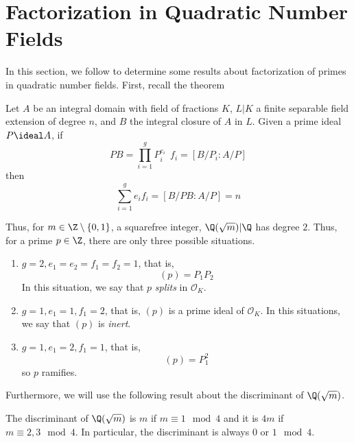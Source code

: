 \documentclass[11pt,leqno,oneside]{amsart}
\numberwithin{thm}{section}
\renewcommand{\O}{\mathcal{O}}
\begin{document}
\section{Factorization in Quadratic Number Fields}
In this section, we follow \cite{ash} to determine some results about
factorization of primes in quadratic number fields. First, recall the theorem
\begin{thm}
  Let \(A\) be an integral domain with field of fractions \(K\),
  \(L|K\) a finite
  separable field extension of degree \(n\), and \(B\) the
  integral closure of \(A\) in 
  \(L\). Given a prime ideal \(P \ideal A\), if \[
    PB = \prod_{i=1}^g P_i^{e_i} \ \ f_i = [B/P_i:A/P]
  \]
  then \[
    \sum_{i=1}^g e_i f_i = [B/PB:A/P] = n
  \]
\end{thm}
Thus, for \(m \in \Z \setminus \{0,1\}\), a squarefree integer,
\(\Q(\sqrt{m})|\Q\) has degree \(2\). Thus, for 
a prime \(p \in \Z\), there are only three possible situations.
\begin{enumerate}
\item \(g=2,e_1=e_2=f_1=f_2=1\), that is, \[
    (p) = P_1 P_2
  \]
  In this situation, we say that \(p\) \emph{splits} in \(\O_K\).
\item \(g=1,e_1=1,f_1=2\), that is, \((p)\) is a prime ideal of
  \(\O_K\). In this situations, we say that \((p)\) is \emph{inert}.
\item \(g=1,e_1=2,f_1=1\), that is, \[
    (p) = P_1^2
  \]
  so \(p\) ramifies.
\end{enumerate}
Furthermore, we will use the following result about the discriminant of
\(\Q(\sqrt{m})\).
\begin{prop}
  The discriminant of \(\Q(\sqrt{m})\) is \(m\) if \(m \equiv 1 \mod 4\)
  and it is \(4m\) if \(m \equiv 2,3 \mod 4\). In particular, the
  discriminant is always \(0\) or \(1 \mod 4\).
\end{prop}
\end{document}
